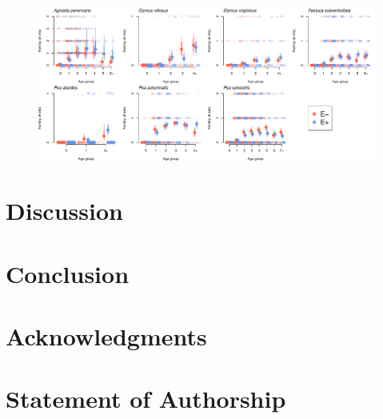 \documentclass[11pt]{article}
\begin{document}
\begin{figure}
	\begin{center}
		\includegraphics[width=1\linewidth]{figures/age_specific_fertility}
		\caption{}
		\label{fig:age_surv}
	\end{center}
\end{figure}

\section*{Discussion}

\section*{Conclusion}




\section*{Acknowledgments}



\section*{Statement of Authorship}
\end{document}

